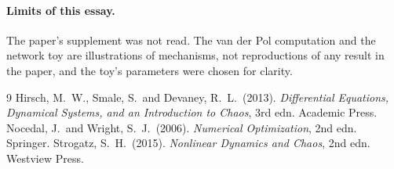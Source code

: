 \documentclass[11pt]{article}
\begin{document}
\paragraph{Limits of this essay.} The paper's supplement was not read. The van der Pol computation and the network toy are illustrations of mechanisms, not reproductions of any result in the paper, and the toy's parameters were chosen for clarity.

\begin{thebibliography}{9}
 Hirsch, M.~W., Smale, S.\ and Devaney, R.~L.\ (2013). \emph{Differential Equations, Dynamical Systems, and an Introduction to Chaos}, 3rd edn. Academic Press.
 Nocedal, J.\ and Wright, S.~J.\ (2006). \emph{Numerical Optimization}, 2nd edn. Springer.
 Strogatz, S.~H.\ (2015). \emph{Nonlinear Dynamics and Chaos}, 2nd edn. Westview Press.
\end{thebibliography}
\end{document}

